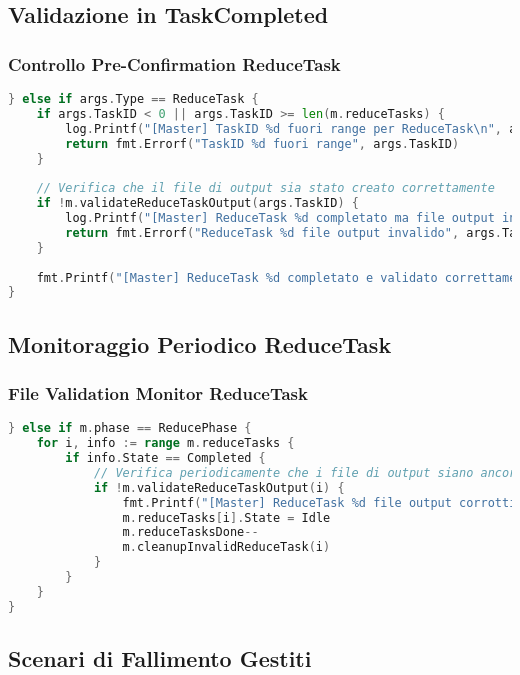 \documentclass[12pt,a4paper]{article}
\begin{document}
\subsection{Validazione in TaskCompleted}

\subsubsection{Controllo Pre-Confirmation ReduceTask}

\begin{lstlisting}[language=go]
} else if args.Type == ReduceTask {
    if args.TaskID < 0 || args.TaskID >= len(m.reduceTasks) {
        log.Printf("[Master] TaskID %d fuori range per ReduceTask\n", args.TaskID)
        return fmt.Errorf("TaskID %d fuori range", args.TaskID)
    }
    
    // Verifica che il file di output sia stato creato correttamente
    if !m.validateReduceTaskOutput(args.TaskID) {
        log.Printf("[Master] ReduceTask %d completato ma file output invalido, rifiuto completamento\n", args.TaskID)
        return fmt.Errorf("ReduceTask %d file output invalido", args.TaskID)
    }
    
    fmt.Printf("[Master] ReduceTask %d completato e validato correttamente\n", args.TaskID)
}
\end{lstlisting}

\subsection{Monitoraggio Periodico ReduceTask}

\subsubsection{File Validation Monitor ReduceTask}

\begin{lstlisting}[language=go]
} else if m.phase == ReducePhase {
    for i, info := range m.reduceTasks {
        if info.State == Completed {
            // Verifica periodicamente che i file di output siano ancora validi
            if !m.validateReduceTaskOutput(i) {
                fmt.Printf("[Master] ReduceTask %d file output corrotti, resetto a Idle\n", i)
                m.reduceTasks[i].State = Idle
                m.reduceTasksDone--
                m.cleanupInvalidReduceTask(i)
            }
        }
    }
}
\end{lstlisting}

\subsection{Scenari di Fallimento Gestiti}
\end{document}
